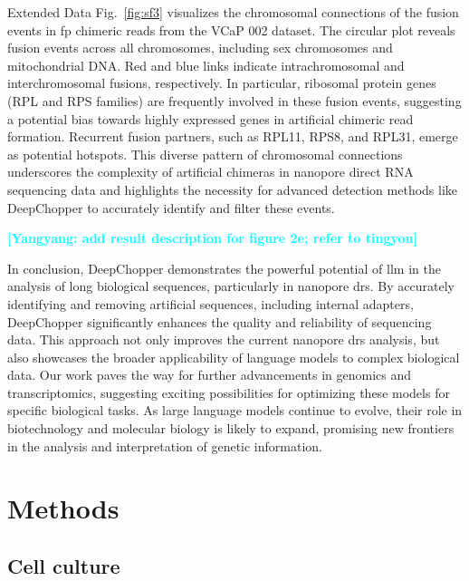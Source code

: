 \documentclass[pdflatex, sn-mathphys-num, lineno]{sn-jnl}%
\newcommand{\yy}[1]{\textcolor{cyan}{\textbf{[Yangyang: #1]}}}
\newcommand{\edfigref}[2]{Extended Data Fig.~\hyperref[#1]{\ref*{#1}#2}}
\theoremstyle{thmstyleone}%
\theoremstyle{thmstyletwo}%
\theoremstyle{thmstylethree}%
\begin{document}
\edfigref{fig:sf3}{} visualizes the chromosomal connections of the fusion events in \gls{fp} chimeric reads from the VCaP 002 dataset.
The circular plot reveals fusion events across all chromosomes, including sex chromosomes and mitochondrial DNA.
Red and blue links indicate intrachromosomal and interchromosomal fusions, respectively.
In particular, ribosomal protein genes (RPL and RPS families) are frequently involved in these fusion events, suggesting a potential bias towards highly expressed genes in artificial chimeric read formation.
Recurrent fusion partners, such as RPL11, RPS8, and RPL31, emerge as potential hotspots. This diverse pattern of chromosomal connections underscores the complexity of artificial chimeras in nanopore direct RNA sequencing data and highlights the necessity for advanced detection methods like DeepChopper to accurately identify and filter these events.

\yy{add result description for figure 2e; refer to tingyou}

In conclusion, DeepChopper demonstrates the powerful potential of \gls{llm} in the analysis of long biological sequences, particularly in nanopore \gls{drs}.
By accurately identifying and removing artificial sequences, including internal adapters, DeepChopper significantly enhances the quality and reliability of sequencing data.
This approach not only improves the current nanopore \gls{drs} analysis, but also showcases the broader applicability of language models to complex biological data.
Our work paves the way for further advancements in genomics and transcriptomics, suggesting exciting possibilities for optimizing these models for specific biological tasks.
As large language models continue to evolve, their role in biotechnology and molecular biology is likely to expand, promising new frontiers in the analysis and interpretation of genetic information.

\section{Methods}\label{sec:methods}

\subsection{Cell culture}
\end{document}
